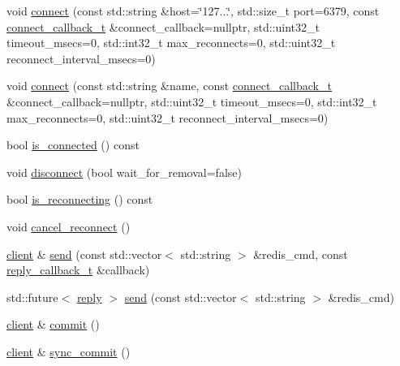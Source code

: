 \begin{DoxyCompactItemize}
void \mbox{\hyperlink{classcpp__redis_1_1client_adda8b3e7b4f9c80ac052753b39178dd5}{connect}} (const std\+::string \&host=\char`\"{}127...\char`\"{}, std\+::size\+\_\+t port=6379, const \mbox{\hyperlink{classcpp__redis_1_1client_a8e8f308847caf0b9ce06b817253c65c7}{connect\+\_\+callback\+\_\+t}} \&connect\+\_\+callback=nullptr, std\+::uint32\+\_\+t timeout\+\_\+msecs=0, std\+::int32\+\_\+t max\+\_\+reconnects=0, std\+::uint32\+\_\+t reconnect\+\_\+interval\+\_\+msecs=0)
\item 
void \mbox{\hyperlink{classcpp__redis_1_1client_a15bcb0885129480543482a7da52af892}{connect}} (const std\+::string \&name, const \mbox{\hyperlink{classcpp__redis_1_1client_a8e8f308847caf0b9ce06b817253c65c7}{connect\+\_\+callback\+\_\+t}} \&connect\+\_\+callback=nullptr, std\+::uint32\+\_\+t timeout\+\_\+msecs=0, std\+::int32\+\_\+t max\+\_\+reconnects=0, std\+::uint32\+\_\+t reconnect\+\_\+interval\+\_\+msecs=0)
\item 
bool \mbox{\hyperlink{classcpp__redis_1_1client_a378682dda2753feff4c174679bd0f9d5}{is\+\_\+connected}} () const
\item 
void \mbox{\hyperlink{classcpp__redis_1_1client_a292252b61bcfdf9ad3854b54b7fe2740}{disconnect}} (bool wait\+\_\+for\+\_\+removal=false)
\item 
bool \mbox{\hyperlink{classcpp__redis_1_1client_ada3dc63edcf04c7db8ffa027bbe85da8}{is\+\_\+reconnecting}} () const
\item 
void \mbox{\hyperlink{classcpp__redis_1_1client_a0ad596a7cd553e18f75cdd78a99d1b05}{cancel\+\_\+reconnect}} ()
\item 
\mbox{\hyperlink{classcpp__redis_1_1client}{client}} \& \mbox{\hyperlink{classcpp__redis_1_1client_a490ef812b666e6d845fcacc808b87bc1}{send}} (const std\+::vector$<$ std\+::string $>$ \&redis\+\_\+cmd, const \mbox{\hyperlink{classcpp__redis_1_1client_af7a65eb21aa25230bfbb0b0203c4fc04}{reply\+\_\+callback\+\_\+t}} \&callback)
\item 
std\+::future$<$ \mbox{\hyperlink{classcpp__redis_1_1reply}{reply}} $>$ \mbox{\hyperlink{classcpp__redis_1_1client_ad6216d6587d50694c16d68e8e182b0be}{send}} (const std\+::vector$<$ std\+::string $>$ \&redis\+\_\+cmd)
\item 
\mbox{\hyperlink{classcpp__redis_1_1client}{client}} \& \mbox{\hyperlink{classcpp__redis_1_1client_a18e123faf9400013ad2f1063e5824dc0}{commit}} ()
\item 
\mbox{\hyperlink{classcpp__redis_1_1client}{client}} \& \mbox{\hyperlink{classcpp__redis_1_1client_ad7d61dadf264bcf27092d9f7f3ff1fd7}{sync\+\_\+commit}} ()

\end{DoxyCompactItemize}
